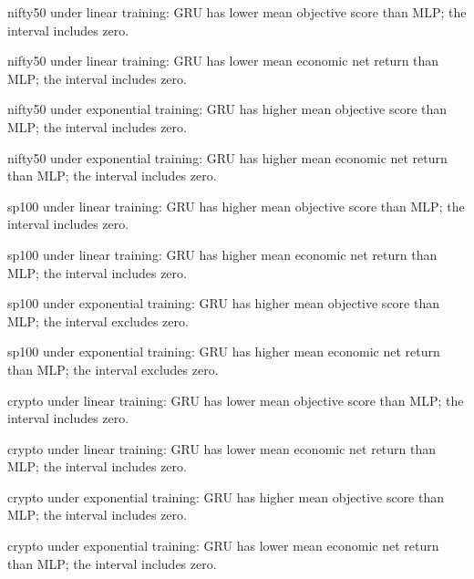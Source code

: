 nifty50 under linear training: GRU has lower mean objective score than MLP; the interval includes zero.

nifty50 under linear training: GRU has lower mean economic net return than MLP; the interval includes zero.

nifty50 under exponential training: GRU has higher mean objective score than MLP; the interval includes zero.

nifty50 under exponential training: GRU has higher mean economic net return than MLP; the interval includes zero.

sp100 under linear training: GRU has higher mean objective score than MLP; the interval includes zero.

sp100 under linear training: GRU has higher mean economic net return than MLP; the interval includes zero.

sp100 under exponential training: GRU has higher mean objective score than MLP; the interval excludes zero.

sp100 under exponential training: GRU has higher mean economic net return than MLP; the interval excludes zero.

crypto under linear training: GRU has lower mean objective score than MLP; the interval includes zero.

crypto under linear training: GRU has lower mean economic net return than MLP; the interval includes zero.

crypto under exponential training: GRU has higher mean objective score than MLP; the interval includes zero.

crypto under exponential training: GRU has lower mean economic net return than MLP; the interval includes zero.